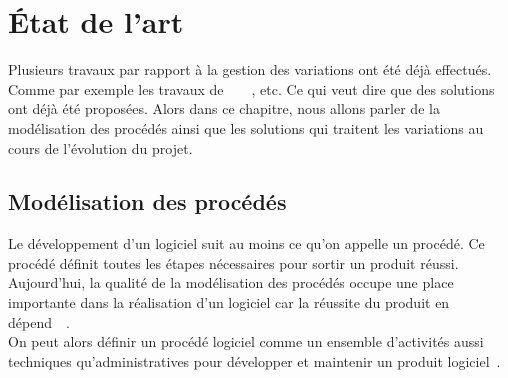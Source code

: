 \chapter{État de l'art} %

\label{Chapitre2} %
Plusieurs travaux par rapport à la gestion des variations ont été déjà effectués. Comme par exemple les travaux de~\cite{sacl}~\cite{alm}~\cite{kabaaj}~\cite{gc}, etc. Ce qui veut dire que des solutions ont déjà été proposées. Alors dans ce chapitre, nous allons parler de la modélisation des procédés ainsi que les solutions qui traitent les variations au cours de l'évolution du projet.
\section{Modélisation des procédés}
Le développement d'un logiciel suit au moins ce qu'on appelle un procédé.  Ce procédé définit toutes les étapes nécessaires pour sortir un produit réussi. Aujourd'hui, la qualité de la modélisation des procédés occupe une place importante dans la réalisation d'un logiciel car la réussite du produit en dépend~\cite{wsh73}~\cite{abgm}.\\
On peut alors définir un procédé logiciel comme un ensemble d'activités aussi techniques qu'administratives pour développer et maintenir un produit logiciel~\cite{jl}.\\
